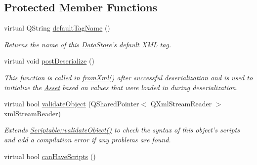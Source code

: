 \subsection*{Protected Member Functions}
\begin{DoxyCompactItemize}
\item 
virtual Q\-String \hyperlink{class_picto_1_1_state_machine_element_afcfbbc6a685a8df36e44ba713eedc811}{default\-Tag\-Name} ()
\begin{DoxyCompactList}\small\item\em Returns the name of this \hyperlink{class_picto_1_1_data_store}{Data\-Store}'s default X\-M\-L tag. \end{DoxyCompactList}\item 
virtual void \hyperlink{class_picto_1_1_state_machine_element_ac71e3f57e16c8be8dc4d6900c836948f}{post\-Deserialize} ()
\begin{DoxyCompactList}\small\item\em This function is called in \hyperlink{class_picto_1_1_asset_a8bed4da09ecb1c07ce0dab313a9aba67}{from\-Xml()} after successful deserialization and is used to initialize the \hyperlink{class_picto_1_1_asset}{Asset} based on values that were loaded in during deserialization. \end{DoxyCompactList}\item 
\hypertarget{class_picto_1_1_state_machine_element_a52a176b16cf803ed3e7f82f3e1a4dfb7}{virtual bool \hyperlink{class_picto_1_1_state_machine_element_a52a176b16cf803ed3e7f82f3e1a4dfb7}{validate\-Object} (Q\-Shared\-Pointer$<$ Q\-Xml\-Stream\-Reader $>$ xml\-Stream\-Reader)}\label{class_picto_1_1_state_machine_element_a52a176b16cf803ed3e7f82f3e1a4dfb7}

\begin{DoxyCompactList}\small\item\em Extends \hyperlink{class_picto_1_1_scriptable_ab6e2944c43a3b5d418bf7b251594386d}{Scriptable\-::validate\-Object()} to check the syntax of this object's scripts and add a compilation error if any problems are found. \end{DoxyCompactList}\item 
\hypertarget{class_picto_1_1_state_machine_element_a3121077e6826109f3f4d97c5c060a4db}{virtual bool \hyperlink{class_picto_1_1_state_machine_element_a3121077e6826109f3f4d97c5c060a4db}{can\-Have\-Scripts} ()}\label{class_picto_1_1_state_machine_element_a3121077e6826109f3f4d97c5c060a4db}


\end{DoxyCompactItemize}
